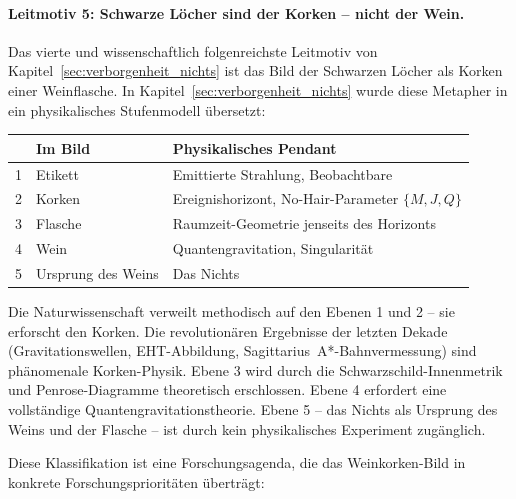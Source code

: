 ﻿\documentclass[12pt,a4paper]{report}
\begin{document}
\paragraph{Leitmotiv 5: Schwarze Löcher sind der Korken -- nicht der Wein.}

Das vierte und wissenschaftlich folgenreichste Leitmotiv von Kapitel~\ref{sec:verborgenheit_nichts} ist das Bild der Schwarzen Löcher als Korken einer Weinflasche. In Kapitel~\ref{sec:verborgenheit_nichts} wurde diese Metapher in ein physikalisches Stufenmodell übersetzt:

\begin{center}
\begin{tabular}{lll}
	\hline
	\textbf{} & \textbf{Im Bild} & \textbf{Physikalisches Pendant} \\
	\hline
	1 & Etikett & Emittierte Strahlung, Beobachtbare \\
	2 & Korken & Ereignishorizont, No-Hair-Parameter $\{M, J, Q\}$ \\
	3 & Flasche & Raumzeit-Geometrie jenseits des Horizonts \\
	4 & Wein & Quantengravitation, Singularität \\
	5 & Ursprung des Weins & Das Nichts \\
	\hline
\end{tabular}
\end{center}

Die Naturwissenschaft verweilt methodisch auf den Ebenen 1 und 2 -- sie erforscht den Korken. Die revolutionären Ergebnisse der letzten Dekade (Gravitationswellen, EHT-Abbildung, Sagittarius~A*-Bahnvermessung) sind phänomenale Korken-Physik. Ebene 3 wird durch die Schwarzschild-Innenmetrik und Penrose-Diagramme theoretisch erschlossen. Ebene 4 erfordert eine vollständige Quantengravitationstheorie. Ebene 5 -- das Nichts als Ursprung des Weins und der Flasche -- ist durch kein physikalisches Experiment zugänglich.

Diese Klassifikation ist eine Forschungsagenda, die das Weinkorken-Bild in konkrete Forschungsprioritäten überträgt:
\end{document}
